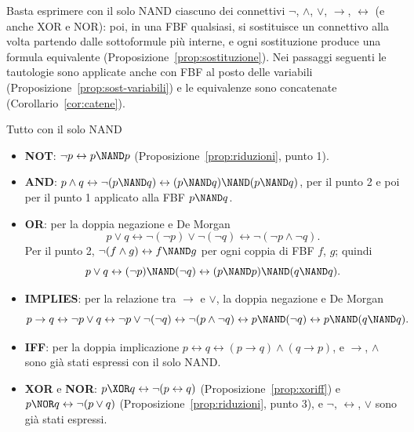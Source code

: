 \begin{concetto}
\begin{dimostrazione}
    Basta esprimere con il solo NAND ciascuno dei connettivi $\neg$, $\wedge$, $\vee$, $\rightarrow$, $\leftrightarrow$
    (e anche XOR e NOR): poi, in una FBF qualsiasi, si sostituisce un connettivo alla volta partendo dalle sottoformule
    più interne, e ogni sostituzione produce una formula equivalente (Proposizione~\ref{prop:sostituzione}).
    Nei passaggi seguenti le tautologie sono applicate anche con FBF al posto delle variabili (Proposizione~\ref{prop:sost-variabili})
    e le equivalenze sono concatenate (Corollario~\ref{cor:catene}).
    \begin{caso}{Tutto con il solo NAND}
    \begin{itemize}
        \item \textbf{NOT}: $\neg p \leftrightarrow p \NAND p$ (Proposizione~\ref{prop:riduzioni}, punto 1).
        \item \textbf{AND}: $p \wedge q \leftrightarrow \neg(p \NAND q) \leftrightarrow (p \NAND q) \NAND (p \NAND q)$,
              per il punto 2 e poi per il punto 1 applicato alla FBF $p \NAND q$.
        \item \textbf{OR}: per la doppia negazione e De Morgan
              \[ p \vee q \leftrightarrow \neg(\neg p) \vee \neg(\neg q) \leftrightarrow \neg(\neg p \wedge \neg q). \]
              Per il punto 2, $\neg(f \wedge g) \leftrightarrow f \NAND g$ per ogni coppia di FBF $f$, $g$; quindi
              \[ p \vee q \leftrightarrow (\neg p) \NAND (\neg q) \leftrightarrow (p \NAND p) \NAND (q \NAND q). \]
        \item \textbf{IMPLIES}: per la relazione tra $\rightarrow$ e $\vee$, la doppia negazione e De Morgan
              \[ p \rightarrow q \leftrightarrow \neg p \vee q \leftrightarrow \neg p \vee \neg(\neg q) \leftrightarrow \neg(p \wedge \neg q)
                 \leftrightarrow p \NAND (\neg q) \leftrightarrow p \NAND (q \NAND q). \]
        \item \textbf{IFF}: per la doppia implicazione $p \leftrightarrow q \leftrightarrow (p \rightarrow q) \wedge (q \rightarrow p)$,
              e $\rightarrow$, $\wedge$ sono già stati espressi con il solo NAND.
        \item \textbf{XOR} e \textbf{NOR}: $p \XOR q \leftrightarrow \neg(p \leftrightarrow q)$ (Proposizione~\ref{prop:xoriff}) e
              $p \NOR q \leftrightarrow \neg(p \vee q)$ (Proposizione~\ref{prop:riduzioni}, punto 3), e $\neg$, $\leftrightarrow$, $\vee$ sono già stati espressi.
    \end{itemize}

\end{caso}
\end{dimostrazione}
\end{concetto}
